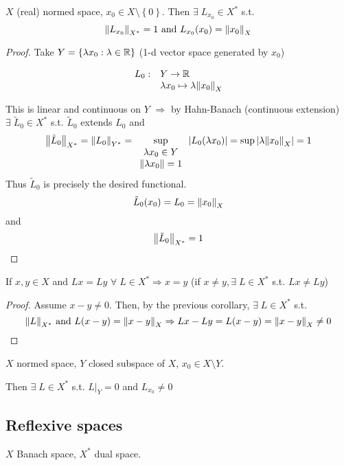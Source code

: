 \begin{corollary}
    \(X\) (real) normed space, \(x_0 \in X \setminus \left\{ 0 \right\}\).
    Then \(\exists \; L_{x_0} \in X^*\) s.t. 
    \[
        \norm{L_{x_0}}_{X^*} = 1 \mbox{ and } L_{x_0}(x_0) = \norm{x_0}_X
    \]
\end{corollary}
\begin{proof}
    Take \(Y = \left\{ \lambda x_0 : \lambda \in \mathbb{R} \right\}\) (1-d vector space generated by \(x_0\))  
    
    \[
        \begin{array}{rl}
            L_0: & Y \to \mathbb{R} \\
            & \lambda x_0 \mapsto \lambda \norm{x_0}_X
        \end{array}    
    \]

    This is linear and continuous on \(Y\) \(\Rightarrow\) by Hahn-Banach (continuous extension) \(\exists \; \tilde{L}_0 \in X^*\) s.t. \(\tilde{L}_0\) extends \(L_0\) and 
    \[
        \norm{\tilde{L}_0}_{X^*} = \norm{L_0}_{Y^*} = \sup_{\begin{array}{c}\lambda x_0 \in Y \\ \norm{\lambda x_0} = 1\end{array}}\abs{L_0(\lambda x_0)}= \sup \abs{\lambda \norm{x_0}_X} = 1
    \]
    Thus \(\tilde{L}_0\) is precisely the desired functional.
    \[
        \tilde{L}_0 (x_0) = L_0 = \norm{x_0}_X
    \]
    and 
    \[
        \norm{\tilde{L}_0}_{X^*} = 1
    \]
\end{proof}
\begin{corollary}
    If \(x,y \in X\) and \(Lx = Ly\) \(\forall \; L \in X^* \Rightarrow x = y\) (if \(x \neq y, \exists \; L \in X^*\) s.t. \(Lx \neq Ly\))
\end{corollary}
\begin{proof}
    Assume \(x-y \neq 0\). Then, by the previous corollary, \(\exists \; L \in X^*\) s.t. 
    \[
        \norm{L}_{X^*} \mbox{ and } L(x-y) = \norm{x-y}_X \Rightarrow Lx -Ly = L(x-y) = \norm{x-y}_X \neq 0
    \]
\end{proof}
\begin{corollary}
    \(X\) normed space, \(Y\) closed subspace of \(X\), \(x_0 \in X \setminus Y\). 

    Then \(\exists \; L \in X^*\) s.t. \(L\vert_Y = 0\) and \(L_{x_0} \neq 0\)
\end{corollary}
\subsection*{Reflexive spaces}
\(X\) Banach space, \(X^*\) dual space.

